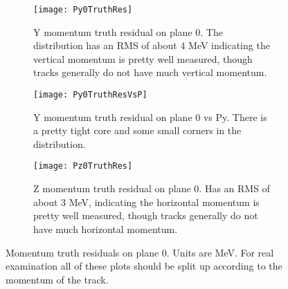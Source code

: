 \begin{figure}
    \centering
    \begin{subfigure}[]{0.6\textwidth}
        \centering
        \texttt{[image: Py0TruthRes]} 
        \caption{Y momentum truth residual on plane 0. The distribution has an RMS of about 4 MeV indicating the vertical momentum is pretty well measured, though tracks generally do not have much vertical momentum.}
    \end{subfigure}

    \begin{subfigure}[]{0.6\textwidth}
        \centering
        \texttt{[image: Py0TruthResVsP]} 
        \caption{Y momentum truth residual on plane 0 vs Py. There is a pretty tight core and some small corners in the distribution.}
    \end{subfigure}
    
    \begin{subfigure}[]{0.6\textwidth}
        \centering
        \texttt{[image: Pz0TruthRes]} 
        \caption{Z momentum truth residual on plane 0. Has an RMS of about 3 MeV, indicating the horizontal momentum is pretty well measured, though tracks generally do not have much horizontal momentum.}
    \end{subfigure}

    \caption{Momentum truth residuals on plane 0. Units are MeV. For real examination all of these plots should be split up according to the momentum of the track.}
\end{figure}

\clearpage

